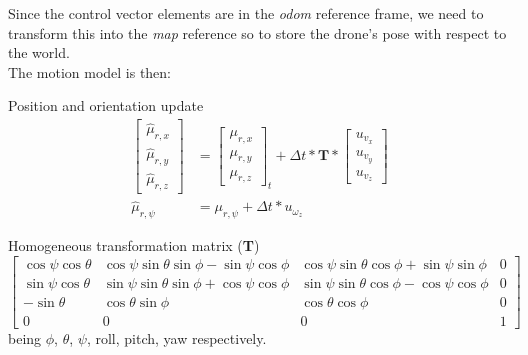 \documentclass{beamer}
\begin{document}
    \begin{frame}
        \justifying
        Since the control vector elements are in the \textit{odom} reference frame, we need to transform this into the \textit{map} reference so to store the drone's pose with respect to the world. \\[10pt]

        The motion model is then:
        \begin{block}{Position and orientation update}
            \begin{align*}
            \begin{bmatrix} \hat\mu_{r,x} \\ \hat\mu_{r,y} \\ \hat\mu_{r,z} \end{bmatrix} &= \begin{bmatrix} \mu_{r, x} \\ \mu_{r, y} \\ \mu_{r, z} \end{bmatrix}_t + \Delta t * \textbf{T} * \begin{bmatrix}
                u_{v_x} \\ u_{v_y} \\ u_{v_z}
            \end{bmatrix}
            \\
            \hat\mu_{r,\psi} &= \mu_{r,\psi} + \Delta t * u_{\omega_z}
            \end{align*}
        \end{block}

        \fontsize{9pt}{2pt}\begin{block}{Homogeneous transformation matrix (\textbf{T})}
            \centering
            $\begin{bmatrix}
            \cos{\psi}\cos{\theta} & \cos{\psi}\sin{\theta}\sin{\phi} - \sin{\psi}\cos{\phi} & \cos{\psi}\sin{\theta}\cos{\phi} + \sin{\psi}\sin{\phi} & 0\\
            \sin{\psi}\cos{\theta} & \sin{\psi}\sin{\theta}\sin{\phi} + \cos{\psi}\cos{\phi} & \sin{\psi}\sin{\theta}\cos{\phi} - \cos{\psi}\cos{\phi} & 0 \\
            -\sin{\theta} & \cos{\theta}\sin{\phi} & \cos{\theta}\cos{\phi} & 0 \\
            0 & 0 & 0 & 1
            \end{bmatrix}
            $
            \tiny{being $\phi$, $\theta$, $\psi$, roll, pitch, yaw respectively.}
        \end{block}

    \end{frame}
\end{document}
